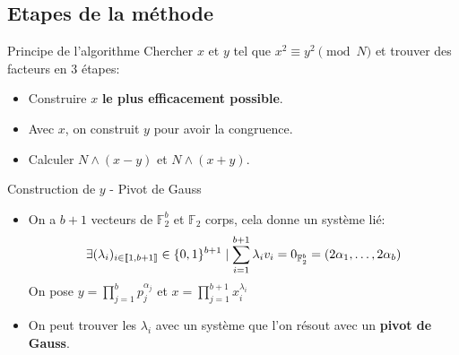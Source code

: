 \documentclass{beamer}
\begin{document}
\subsection{Etapes de la méthode}
\begin{frame}{Principe de l'algorithme}
    Chercher $x$ et $y$ tel que $x^2 \equiv y^2 \pmod N$ et trouver des facteurs en 3 étapes:

    \begin{itemize}
        \item Construire $x$ \textbf{le plus efficacement possible}.
        \item Avec $x$, on construit $y$ pour avoir la congruence.
        \item Calculer $N \land (x-y)$ et $N\land (x+y)$.
    \end{itemize}
    
\end{frame}



\begin{frame}{Construction de $y$ - Pivot de Gauss}
    \begin{itemize}
        \item On a $b+1$ vecteurs de $\mathbb F_2^b$ et $\mathbb F_2$ corps, cela donne un système lié:
        $$
        \exists (\lambda_i)_{i \in \llbracket 1,b+1 \rrbracket}\in \mathbb \{0,1\}^{b+1} \mid \sum_{i=1}^{b+1} \lambda_iv_i = 0_{\mathbb F_2^b} = (2\alpha_1, \dots, 2\alpha_b)
        $$
        On pose $y = \prod_{j=1}^b p_j^{\alpha_j}$ et $x = \prod_{j=1}^{b+1}x_i^{\lambda_i}$ 
        \item On peut trouver les $\lambda_i$ avec un système que l'on résout avec un \textbf{pivot de Gauss}.
    \end{itemize}
\end{frame}
\end{document}
